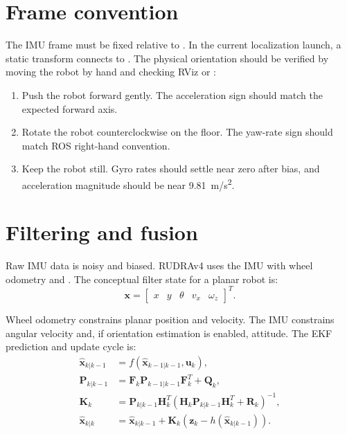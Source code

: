 \section{Frame convention}
The IMU frame must be fixed relative to .  In the current localization launch, a static transform connects  to .  The physical orientation should be verified by moving the robot by hand and checking RViz or :

\begin{enumerate}
  \item Push the robot forward gently.  The acceleration sign should match the expected  forward axis.
  \item Rotate the robot counterclockwise on the floor.  The yaw-rate sign should match ROS right-hand convention.
  \item Keep the robot still.  Gyro rates should settle near zero after bias, and acceleration magnitude should be near \SI{9.81}{m/s^2}.
\end{enumerate}

\section{Filtering and fusion}
Raw IMU data is noisy and biased.  RUDRAv4 uses the IMU with wheel odometry and .  The conceptual filter state for a planar robot is:
\begin{equation}
\mathbf{x} = \begin{bmatrix} x & y & \theta & v_x & \omega_z \end{bmatrix}^{T}.
\end{equation}

Wheel odometry constrains planar position and velocity.  The IMU constrains angular velocity and, if orientation estimation is enabled, attitude.  The EKF prediction and update cycle is:
\begin{align}
\hat{\mathbf{x}}_{k|k-1} &= f(\hat{\mathbf{x}}_{k-1|k-1},\mathbf{u}_{k}) ,\\
\mathbf{P}_{k|k-1} &= \mathbf{F}_{k}\mathbf{P}_{k-1|k-1}\mathbf{F}_{k}^{T}+\mathbf{Q}_{k},\\
\mathbf{K}_{k} &= \mathbf{P}_{k|k-1}\mathbf{H}_{k}^{T}\left(\mathbf{H}_{k}\mathbf{P}_{k|k-1}\mathbf{H}_{k}^{T}+\mathbf{R}_{k}\right)^{-1},\\
\hat{\mathbf{x}}_{k|k} &= \hat{\mathbf{x}}_{k|k-1} + \mathbf{K}_{k}\left(\mathbf{z}_{k}-h(\hat{\mathbf{x}}_{k|k-1})\right).
\end{align}

